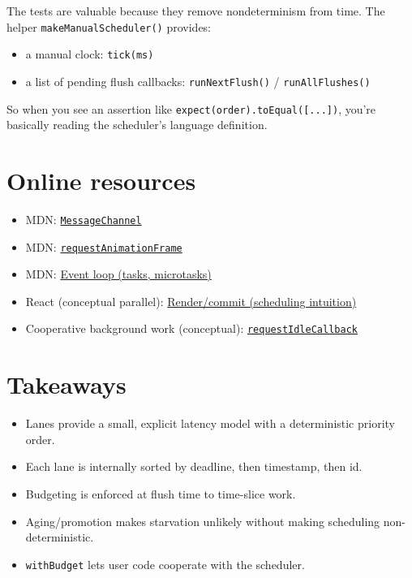 The tests are valuable because they remove nondeterminism from time.
The helper \texttt{makeManualScheduler()} provides:

\begin{itemize}
  \item a manual clock: \texttt{tick(ms)}
  \item a list of pending flush callbacks: \texttt{runNextFlush()} / \texttt{runAllFlushes()}
\end{itemize}

So when you see an assertion like \texttt{expect(order).toEqual([...])}, you're basically reading the scheduler's language definition.

\section{Online resources}

\begin{itemize}
  \item MDN: \href{https://developer.mozilla.org/en-US/docs/Web/API/MessageChannel}{\texttt{MessageChannel}}
  \item MDN: \href{https://developer.mozilla.org/en-US/docs/Web/API/window/requestAnimationFrame}{\texttt{requestAnimationFrame}}
  \item MDN: \href{https://developer.mozilla.org/en-US/docs/Web/JavaScript/Event_loop}{Event loop (tasks, microtasks)}
  \item React (conceptual parallel): \href{https://react.dev/learn/render-and-commit}{Render/commit (scheduling intuition)}
  \item Cooperative background work (conceptual): \href{https://developers.google.com/web/updates/2015/08/using-requestidlecallback}{\texttt{requestIdleCallback}}
\end{itemize}

\section{Takeaways}

\begin{itemize}
  \item Lanes provide a small, explicit latency model with a deterministic priority order.
  \item Each lane is internally sorted by deadline, then timestamp, then id.
  \item Budgeting is enforced at flush time to time-slice work.
  \item Aging/promotion makes starvation unlikely without making scheduling non-deterministic.
  \item \texttt{withBudget} lets user code cooperate with the scheduler.
\end{itemize}
